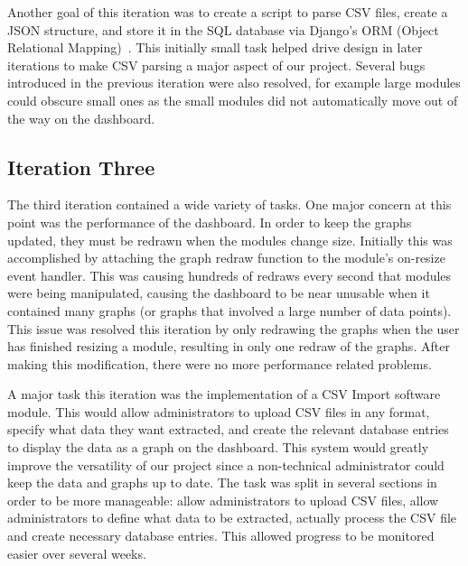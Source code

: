\documentclass{l3proj}
\begin{document}
Another goal of this iteration was to create a script to parse CSV files, create a JSON structure, and store it in the SQL database via Django's ORM (Object Relational Mapping)~\cite{DjangoORM}. This initially small task helped drive design in later iterations to make CSV parsing a major aspect of our project. Several bugs introduced in the previous iteration were also resolved, for example large modules could obscure small ones as the small modules did not automatically move out of the way on the dashboard.

\subsection{Iteration Three}
\label{sec:development:iteration-three}

The third iteration contained a wide variety of tasks. One major concern at this point was the performance of the dashboard. In order to keep the graphs updated, they must be redrawn when the modules change size. Initially this was accomplished by attaching the graph redraw function to the module's on-resize event handler. This was causing hundreds of redraws every second that modules were being manipulated, causing the dashboard to be near unusable when it contained many graphs (or graphs that involved a large number of data points). This issue was resolved this iteration by only redrawing the graphs when the user has finished resizing a module, resulting in only one redraw of the graphs. After making this modification, there were no more performance related problems.

A major task this iteration was the implementation of a CSV Import software module. This would allow administrators to upload CSV files in any format, specify what data they want extracted, and create the relevant database entries to display the data as a graph on the dashboard. This system would greatly improve the versatility of our project since a non-technical administrator could keep the data and graphs up to date. The task was split in several sections in order to be more manageable: allow administrators to upload CSV files, allow administrators to define what data to be extracted, actually process the CSV file and create necessary database entries. This allowed progress to be monitored easier over several weeks.
\end{document}
